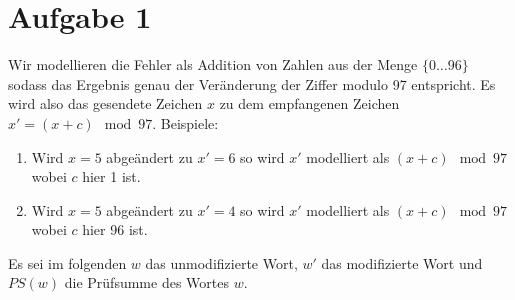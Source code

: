 

\section*{Aufgabe 1}
Wir modellieren die Fehler als Addition von Zahlen aus der Menge $\lbrace 0 \ldots 96\rbrace$ sodass das Ergebnis genau der Veränderung der Ziffer modulo 97 entspricht.
Es wird also das gesendete Zeichen $x$ zu dem empfangenen Zeichen $x' = (x + c) \mod 97$.
Beispiele:
\begin{enumerate}
	\item Wird $x = 5$ abgeändert zu $x' = 6$ so wird $x'$  modelliert als $(x + c) \mod 97$ wobei $c$ hier 1 ist.
	\item Wird $x = 5$ abgeändert zu $x' = 4$ so wird $x'$  modelliert als $(x + c) \mod 97$ wobei $c$ hier 96 ist.
\end{enumerate}

Es sei im folgenden $w$ das unmodifizierte Wort, $w'$ das modifizierte Wort und $PS(w)$ die Prüfsumme des Wortes $w$.

